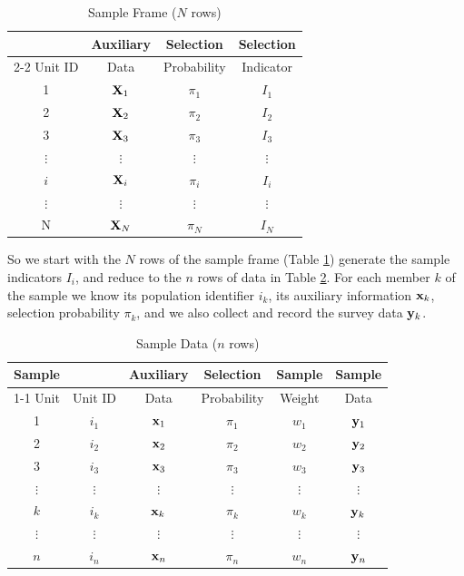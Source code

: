 \documentclass[
]{book}
\begin{document}
\begin{table}
\centering
\caption{\label{tab:sampleframe}Sample Frame ($N$ rows)}
\centering
\begin{tabular}[t]{c|c|c|c}
\hline
\multicolumn{1}{c|}{ } & \multicolumn{1}{c|}{Auxiliary} & \multicolumn{1}{c|}{Selection} & \multicolumn{1}{c}{Selection} \\
\cline{2-2} \cline{3-3} \cline{4-4}
Unit ID & Data & Probability & Indicator\\
\hline
1 & ${\bf X}_1$ & $\pi_1$ & $I_1$\\
\hline
2 & ${\bf X}_2$ & $\pi_2$ & $I_2$\\
\hline
3 & ${\bf X}_3$ & $\pi_3$ & $I_3$\\
\hline
$\vdots$ & $\vdots$ & $\vdots$ & $\vdots$\\
\hline
$i$ & ${\bf X}_i$ & $\pi_i$ & $I_i$\\
\hline
$\vdots$ & $\vdots$ & $\vdots$ & $\vdots$\\
\hline
N & ${\bf X}_N$ & $\pi_N$ & $I_N$\\
\hline
\end{tabular}
\end{table}

So we start with the \(N\) rows of the sample frame (Table \ref{tab:sampleframe}) generate
the sample indicators \(I_i\), and reduce to the \(n\) rows of data in Table \ref{tab:sampledata}.
For each member \(k\) of the sample we know its population identifier \(i_k\), its auxiliary information
\({\bf x}_k\), selection probability \(\pi_k\), and we also collect and record the survey data \({\bf y}_k\).

\begin{table}
\centering
\caption{\label{tab:sampledata}Sample Data ($n$ rows)}
\centering
\begin{tabular}[t]{c|c|c|c|c|c}
\hline
\multicolumn{1}{c|}{Sample} & \multicolumn{1}{c|}{ } & \multicolumn{1}{c|}{Auxiliary} & \multicolumn{1}{c|}{Selection} & \multicolumn{1}{c|}{Sample} & \multicolumn{1}{c}{Sample} \\
\cline{1-1} \cline{3-3} \cline{4-4} \cline{5-5} \cline{6-6}
Unit & Unit ID & Data & Probability & Weight & Data\\
\hline
1 & $i_1$ & ${\bf x}_1$ & $\pi_1$ & $w_1$ & ${\bf y}_1$\\
\hline
2 & $i_2$ & ${\bf x}_2$ & $\pi_2$ & $w_2$ & ${\bf y}_2$\\
\hline
3 & $i_3$ & ${\bf x}_3$ & $\pi_3$ & $w_3$ & ${\bf y}_3$\\
\hline
$\vdots$ & $\vdots$ & $\vdots$ & $\vdots$ & $\vdots$ & $\vdots$\\
\hline
$k$ & $i_k$ & ${\bf x}_k$ & $\pi_k$ & $w_k$ & ${\bf y}_k$\\
\hline
$\vdots$ & $\vdots$ & $\vdots$ & $\vdots$ & $\vdots$ & $\vdots$\\
\hline
$n$ & $i_n$ & ${\bf x}_n$ & $\pi_n$ & $w_n$ & ${\bf y}_n$\\
\hline
\end{tabular}
\end{table}
\end{document}
